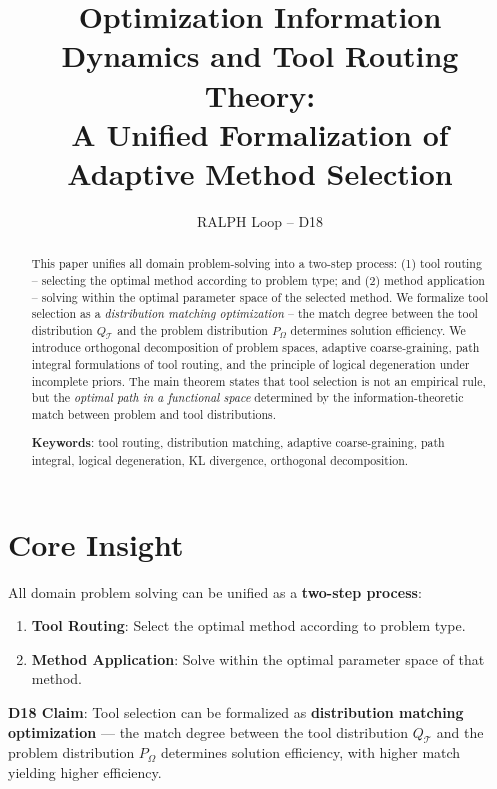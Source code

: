 \documentclass[12pt, a4paper]{article}
\begin{document}
\title{Optimization Information Dynamics and Tool Routing Theory: \\A Unified Formalization of Adaptive Method Selection}
\author{RALPH Loop -- D18}
\date{}
\maketitle

\begin{abstract}
This paper unifies all domain problem-solving into a two-step process: (1) tool routing -- selecting the optimal method according to problem type; and (2) method application -- solving within the optimal parameter space of the selected method. We formalize tool selection as a \emph{distribution matching optimization} -- the match degree between the tool distribution $Q_{\mathcal{T}}$ and the problem distribution $P_{\Omega}$ determines solution efficiency. We introduce orthogonal decomposition of problem spaces, adaptive coarse-graining, path integral formulations of tool routing, and the principle of logical degeneration under incomplete priors. The main theorem states that tool selection is not an empirical rule, but the \emph{optimal path in a functional space} determined by the information-theoretic match between problem and tool distributions.

\textbf{Keywords}: tool routing, distribution matching, adaptive coarse-graining, path integral, logical degeneration, KL divergence, orthogonal decomposition.
\end{abstract}

\tableofcontents

\section{Core Insight}

All domain problem solving can be unified as a \textbf{two-step process}:
\begin{enumerate}
\item \textbf{Tool Routing}: Select the optimal method according to problem type.
\item \textbf{Method Application}: Solve within the optimal parameter space of that method.
\end{enumerate}

\textbf{D18 Claim}: Tool selection can be formalized as \textbf{distribution matching optimization} --- the match degree between the tool distribution $Q_{\mathcal{T}}$ and the problem distribution $P_{\Omega}$ determines solution efficiency, with higher match yielding higher efficiency.
\end{document}
